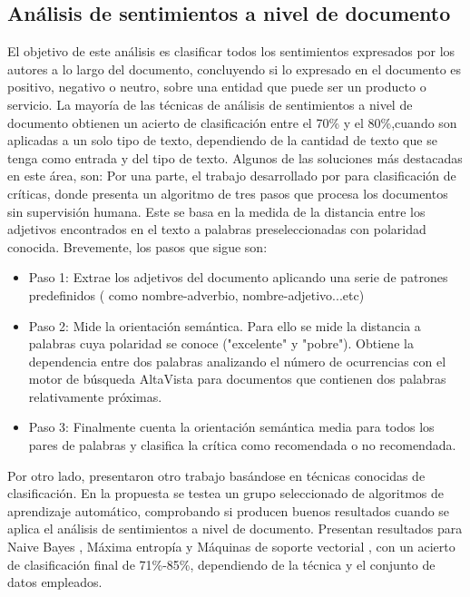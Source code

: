 \subsection{Análisis de sentimientos a nivel de documento}
El objetivo de este análisis es clasificar todos los sentimientos expresados por los autores a lo largo del documento, concluyendo si lo expresado en el documento es positivo, negativo o neutro, sobre una entidad que puede ser un producto o servicio. La mayoría de las técnicas de análisis de sentimientos a nivel de documento obtienen un acierto de clasificación entre el 70\% y el 80\%,cuando son aplicadas a un solo tipo de texto, dependiendo de la cantidad de texto que se tenga como entrada y del tipo de texto. \newline
Algunos de las soluciones más destacadas en este área, son:\newline
Por una parte, el trabajo desarrollado por  \citet{turney2002thumbs} para clasificación de críticas, donde presenta un algoritmo de tres pasos que procesa los documentos sin supervisión humana. Este se basa en la medida de la distancia entre los adjetivos encontrados en el texto a palabras preseleccionadas con polaridad conocida. Brevemente, los pasos que sigue son:\newline
\begin{itemize}
\item Paso 1: Extrae los adjetivos del documento aplicando una serie de patrones predefinidos ( como nombre-adverbio, nombre-adjetivo...etc)
\item Paso 2: Mide la orientación semántica. Para ello se mide la distancia a palabras cuya polaridad se conoce ("excelente" y "pobre"). Obtiene la dependencia entre dos palabras analizando el número de ocurrencias con el motor de búsqueda \textcolor{SchoolColor}{AltaVista} para documentos que contienen dos palabras relativamente próximas. 
\item Paso 3: Finalmente cuenta la orientación semántica media para todos los pares de palabras y  clasifica la crítica como recomendada o no recomendada. 
\end{itemize}

Por otro lado, \citet{pang2002thumbs} presentaron otro trabajo basándose en técnicas conocidas de clasificación. En la propuesta se testea un grupo seleccionado de algoritmos de aprendizaje automático, comprobando si producen buenos resultados cuando se aplica el análisis de sentimientos a nivel de documento.\newline
Presentan resultados para \textsf{Naive Bayes} \citet{lewis1998naive}, \textsf{Máxima entropía} \citet{berger1996maximum} y \textsf{Máquinas de soporte vectorial} \citet{joachims1998text}, con un acierto de clasificación final de 71\%-85\%, dependiendo de la técnica y el conjunto de datos empleados.       
